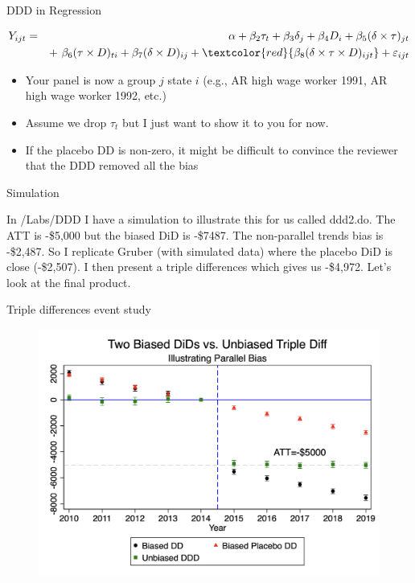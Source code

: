 \documentclass{beamer}
\begin{document}
\begin{frame}{DDD in Regression}
	
	\begin{eqnarray*}
	Y_{ijt} &=&\alpha +  \beta_2 \tau_t + \beta_3 \delta_j  + \beta_4 D_i + \beta_5(\delta \times \tau)_{jt} \\
	&& +\ \beta_6(\tau \times D)_{ti} +  \beta_7(\delta \times D)_{ij} +  \textcolor{red}{\beta_8(\delta \times \tau \times  D)_{ijt}}+  \varepsilon_{ijt}
	\end{eqnarray*}
	
	\begin{itemize}
	\item Your panel is now a group $j$ state $i$ (e.g., AR high wage worker 1991, AR high wage worker 1992, etc.)
	\item Assume we drop $\tau_t$ but I just want to show it to you for now.
	\item If the placebo DD is non-zero, it might be difficult to convince the reviewer that the DDD removed all the bias 
	\end{itemize}
	
\end{frame}



\begin{frame}{Simulation}

In /Labs/DDD I have a simulation to illustrate this for us called ddd2.do.  The ATT is -\$5,000 but the biased DiD is -\$7487.  The non-parallel trends bias is -\$2,487.  So I replicate Gruber (with simulated data) where the placebo DiD is close (-\$2,507).  I then present a triple differences which gives us -\$4,972. Let's look at the final product.

\end{frame}

\begin{frame}{Triple differences event study}

\begin{figure}
\includegraphics[scale=0.25]{./lecture_includes/ddd_simulation}
\end{figure}



\end{frame}  
\end{document}
